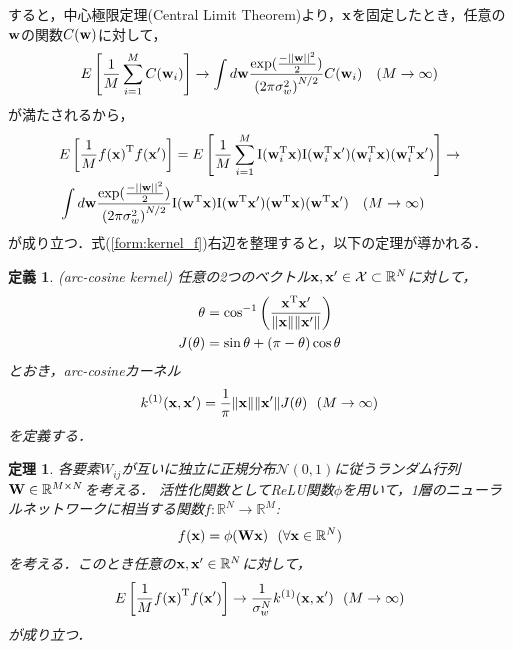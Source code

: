 \documentclass[11pt,a4j]{article}
\newtheorem{dfn}{定義}
\newtheorem{thm}{定理}
\begin{document}
      すると，中心極限定理(Central Limit Theorem)より，${\bf x}$を固定したとき，任意の${\bf w}$の関数$C({\bf w})$に対して，
      \begin{align}
        E\left[ \frac{1}{M} \sum_{i=1}^{M} C({\bf w}_i) \right] \to
        \int d{\bf w} \frac{\exp (\frac{- {|| {\bf w} ||}^2}{2})}{{(2 \pi \sigma_w^2 )}^{N / 2}}
        C({\bf w}_i) ~~~ (M \to \infty)
      \end{align}
      が満たされるから，
      \begin{align}
        &E\left[ \frac{1}{M} {f({\bf x})}^{\mathrm{T}} f({\bf x}') \right] 
        = E\left[ \frac{1}{M} \sum_{i=1}^{M} {\mathrm{I}}( {\bf w}_{i}^{\mathrm{T}} {\bf x} ) {\mathrm{I}}( {\bf w}_{i}^{\mathrm{T}} {\bf x}' ) 
        ( {\bf w}_{i}^{\mathrm{T}} {\bf x} ) ( {\bf w}_{i}^{\mathrm{T}} {\bf x}' ) \right] 
        \to \nonumber \\
        &\int d{\bf w} \frac{\exp (\frac{- {|| {\bf w} ||}^2}{2})}{{(2 \pi \sigma_w^2 )}^{N / 2}}
        {\mathrm{I}}( {\bf w}^{\mathrm{T}} {\bf x} ) {\mathrm{I}}( {\bf w}^{\mathrm{T}} {\bf x}' ) 
        ( {\bf w}^{\mathrm{T}} {\bf x} ) ( {\bf w}^{\mathrm{T}} {\bf x}' ) ~~~ (M \to \infty) \label{form:kernel_f} 
      \end{align}
      が成り立つ．式(\ref{form:kernel_f})右辺を整理すると，以下の定理が導かれる．

      \begin{dfn}
        (arc-cosine kernel)
        任意の2つのベクトル${\bf x}, {\bf x}' \in \mathcal{X} \subset \mathbb{R}^{N}$に対して，
        \begin{align}
          \theta &= {\cos}^{-1} \left( \frac{{\bf x}^{\mathrm{T}} {\bf x}'}{ \|{\bf x}\| \|{\bf x}'\| } \right) \\
          J(\theta) &= \sin \theta + (\pi - \theta) \cos \theta
        \end{align}
        とおき，arc-cosineカーネル
        \begin{align}
          k^{(1)}({\bf x}, {\bf x}') = \frac{1}{\pi} \| {\bf x} \| \| {\bf x}' \| J(\theta) ~~ (M \to \infty)
        \end{align}
        を定義する．
      \end{dfn}

      \begin{thm}\label{thm:clt_dnn}
        各要素$W_{ij}$が互いに独立に正規分布$\mathcal{N}(0, 1)$に従うランダム行列${\bf W} \in \mathbb{R}^{M \times N}$を考える．
        活性化関数としてReLU関数$\phi$を用いて，1層のニューラルネットワークに相当する関数$f:\mathbb{R}^{N} \to \mathbb{R}^{M}$:
        \begin{align}
          f({\bf x}) = \phi({\bf Wx}) ~~ (\forall {\bf x} \in \mathbb{R}^{N})
        \end{align}
        を考える．このとき任意の${\bf x}, {\bf x}' \in \mathbb{R}^{N}$に対して，
        \begin{align}
          E \left[ \frac{1}{M} {f({\bf x})}^{\mathrm{T}} f({\bf x}') \right] \to
          \frac{1}{\sigma_w^N} k^{(1)}({\bf x}, {\bf x}') ~~ (M \to \infty)
        \end{align}
        が成り立つ．
      \end{thm}
\end{document}
